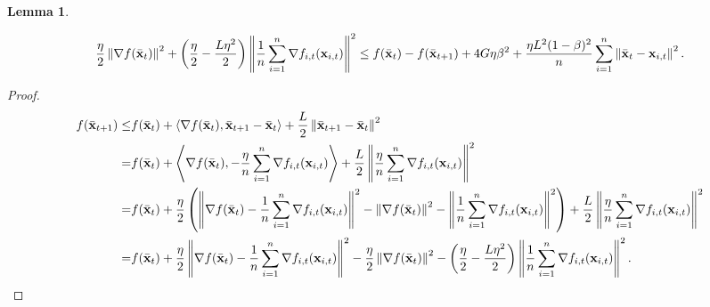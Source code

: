 \documentclass{article}
\newtheorem{Lemma}{\bf{Lemma}}
\begin{document}
\begin{Lemma}
\label{lemma_gradient_norm_bound}

\nonumber
\begin{align}
\nonumber
\frac{\eta}{2}\left\lVert\nabla f(\bar{{\bf x}}_t)\right\rVert^2 + \left( \frac{\eta}{2} - \frac{L\eta^2}{2} \right)\left\lVert\frac{1}{n}\sum_{i=1}^n \nabla f_{i,t}({\bf x}_{i,t})\right\rVert^2 \le f(\bar{{\bf x}}_t) - f(\bar{{\bf x}}_{t+1}) + 4G\eta\beta^2 +  \frac{\eta L^2(1-\beta)^2}{n}\sum_{i=1}^n\left\lVert\bar{{\bf x}}_t - {\bf x}_{i,t} \right\rVert^2.
\end{align}
\end{Lemma}
\begin{proof}

\begin{align}
\nonumber
f(\bar{{\bf x}}_{t+1})\le & f(\bar{{\bf x}}_t) + \left\langle\nabla f(\bar{{\bf x}}_t), \bar{{\bf x}}_{t+1} - \bar{{\bf x}}_t \right\rangle + \frac{L}{2}\left\lVert\bar{{\bf x}}_{t+1} - \bar{{\bf x}}_t\right\rVert^2 \\ \nonumber
= & f(\bar{{\bf x}}_t) + \left\langle\nabla f(\bar{{\bf x}}_t), -\frac{\eta}{n}\sum_{i=1}^n \nabla f_{i,t}({\bf x}_{i,t}) \right\rangle + \frac{L}{2}\left\lVert\frac{\eta}{n}\sum_{i=1}^n \nabla f_{i,t}({\bf x}_{i,t})\right\rVert^2 \\ \nonumber
= & f(\bar{{\bf x}}_t) + \frac{\eta}{2}\left( \left\lVert\nabla f(\bar{{\bf x}}_t) -\frac{1}{n}\sum_{i=1}^n \nabla f_{i,t}({\bf x}_{i,t})\right\rVert^2 - \left\lVert\nabla f(\bar{{\bf x}}_t)\right\rVert^2 - \left\lVert\frac{1}{n}\sum_{i=1}^n \nabla f_{i,t}({\bf x}_{i,t})\right\rVert^2  \right) + \frac{L}{2}\left\lVert\frac{\eta}{n}\sum_{i=1}^n \nabla f_{i,t}({\bf x}_{i,t})\right\rVert^2 \\ \label{equa_lemma_norm_gradient_square}
= & f(\bar{{\bf x}}_t) + \frac{\eta}{2}\left\lVert\nabla f(\bar{{\bf x}}_t) -\frac{1}{n}\sum_{i=1}^n \nabla f_{i,t}({\bf x}_{i,t})\right\rVert^2 - \frac{\eta}{2}\left\lVert\nabla f(\bar{{\bf x}}_t)\right\rVert^2 - \left( \frac{\eta}{2} - \frac{L\eta^2}{2} \right)\left\lVert\frac{1}{n}\sum_{i=1}^n \nabla f_{i,t}({\bf x}_{i,t})\right\rVert^2.
\end{align} 


\end{proof}
\end{document}
